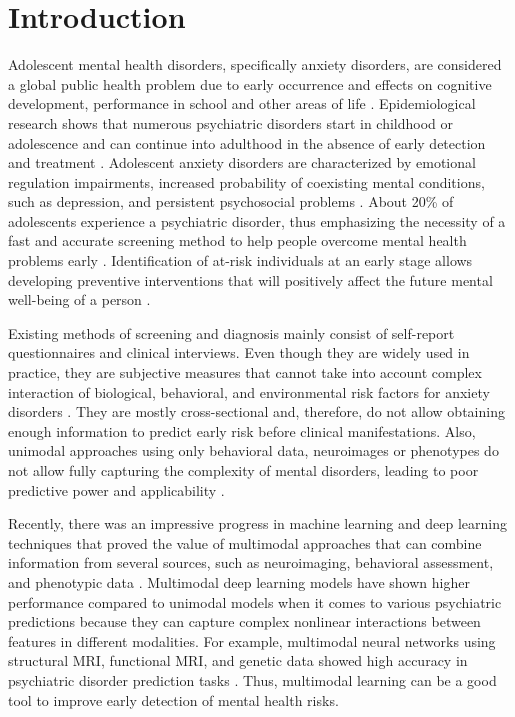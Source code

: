 \documentclass[10pt,letterpaper]{article}
\begin{document}

        \linenumbers

        \section*{Introduction}
        Adolescent mental health disorders, specifically anxiety disorders, are considered a global public health problem due to early occurrence and effects on cognitive development, performance in school and other areas of life \cite{ref36,ref37}. Epidemiological research shows that numerous psychiatric disorders start in childhood or adolescence and can continue into adulthood in the absence of early detection and treatment \cite{ref36,ref38}. Adolescent anxiety disorders are characterized by emotional regulation impairments, increased probability of coexisting mental conditions, such as depression, and persistent psychosocial problems \cite{ref17}. About 20\% of adolescents experience a psychiatric disorder, thus emphasizing the necessity of a fast and accurate screening method to help people overcome mental health problems early \cite{ref37}. Identification of at-risk individuals at an early stage allows developing preventive interventions that will positively affect the future mental well-being of a person \cite{ref38}.
        
        
        Existing methods of screening and diagnosis mainly consist of self-report questionnaires and clinical interviews. Even though they are widely used in practice, they are subjective measures that cannot take into account complex interaction of biological, behavioral, and environmental risk factors for anxiety disorders \cite{ref11,ref13}. They are mostly cross-sectional and, therefore, do not allow obtaining enough information to predict early risk before clinical manifestations. Also, unimodal approaches using only behavioral data, neuroimages or phenotypes do not allow fully capturing the complexity of mental disorders, leading to poor predictive power and applicability \cite{ref40}.
        
        
        
        Recently, there was an impressive progress in machine learning and deep learning techniques that proved the value of multimodal approaches that can combine information from several sources, such as neuroimaging, behavioral assessment, and phenotypic data \cite{ref1,ref25}. Multimodal deep learning models have shown higher performance compared to unimodal models when it comes to various psychiatric predictions because they can capture complex nonlinear interactions between features in different modalities. For example, multimodal neural networks using structural MRI, functional MRI, and genetic data showed high accuracy in psychiatric disorder prediction tasks \cite{ref25,ref39}. Thus, multimodal learning can be a good tool to improve early detection of mental health risks.
\end{document}
